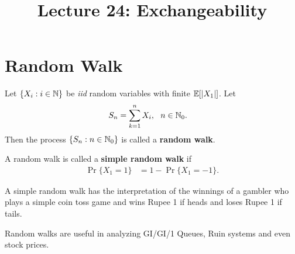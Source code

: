 \documentclass[a4paper,10pt,english]{article}
\title{Lecture 24: Exchangeability}
\author{}
\begin{document}
\maketitle
\section{Random Walk}
\begin{defn} Let $\{X_i: i \in \mathbb{N}\}$ be \textit{iid} random variables with finite $\mathbb{E}[|X_1|]$. Let
\begin{align*}
S_n &= \sum_{k=1}^n X_i, ~~n \in \mathbb{N}_0.
\end{align*}
Then the process $\{S_n: n \in \mathbb{N}_0\}$ is called a \textbf{random walk}. 
\end{defn}
\begin{defn} A random walk is called a \textbf{simple random walk} if
\begin{align*}
\Pr\{X_1 = 1\} &= 1- \Pr\{X_1 = -1\}.
\end{align*}
\end{defn}
\begin{rem} A simple random walk has the interpretation of the winnings of a gambler who plays a simple coin toss game and wins Rupee 1 if heads and loses Rupee 1 if tails. 
\end{rem}
\begin{rem} Random walks are useful in analyzing GI/GI/1 Queues, Ruin systems and even stock prices.
\end{rem}
\end{document}
